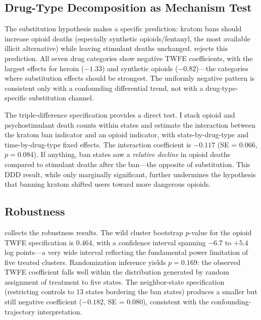 \documentclass[12pt]{article}
\begin{document}
\subsection{Drug-Type Decomposition as Mechanism Test}

The substitution hypothesis makes a specific prediction: kratom bans should increase opioid deaths (especially synthetic opioids/fentanyl, the most available illicit alternative) while leaving stimulant deaths unchanged.  rejects this prediction. All seven drug categories show negative TWFE coefficients, with the largest effects for heroin ($-1.33$) and synthetic opioids ($-0.82$)---the categories where substitution effects should be strongest. The uniformly negative pattern is consistent only with a confounding differential trend, not with a drug-type-specific substitution channel.

The triple-difference specification provides a direct test. I stack opioid and psychostimulant death counts within states and estimate the interaction between the kratom ban indicator and an opioid indicator, with state-by-drug-type and time-by-drug-type fixed effects. The interaction coefficient is $-0.117$ (SE = 0.066, $p = 0.084$). If anything, ban states saw a \emph{relative decline} in opioid deaths compared to stimulant deaths after the ban---the opposite of substitution. This DDD result, while only marginally significant, further undermines the hypothesis that banning kratom shifted users toward more dangerous opioids.

\subsection{Robustness}



 collects the robustness results. The wild cluster bootstrap $p$-value for the opioid TWFE specification is 0.464, with a confidence interval spanning $-6.7$ to $+5.4$ log points---a very wide interval reflecting the fundamental power limitation of five treated clusters. Randomization inference yields $p = 0.169$: the observed TWFE coefficient falls well within the distribution generated by random assignment of treatment to five states. The neighbor-state specification (restricting controls to 13 states bordering the ban states) produces a smaller but still negative coefficient ($-0.182$, SE = 0.080), consistent with the confounding-trajectory interpretation.


\end{document}
